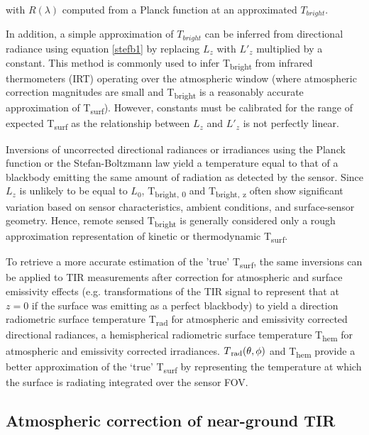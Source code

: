 \noindent with $ R(\lambda) $ computed from a Planck function at an approximated $T_{bright}$. 

In addition, a simple approximation of $T_{bright}$ can be inferred from directional radiance using equation \ref{stefb1} by replacing $ L_z $ with $L'_z$ multiplied by a constant. This method is commonly used to infer T\textsubscript{bright} from infrared thermometers (IRT) operating over the atmospheric window (where atmospheric correction magnitudes are small and T\textsubscript{bright} is a reasonably accurate approximation of T\textsubscript{surf}). However, constants must be calibrated for the range of expected T\textsubscript{surf} as the relationship between $ L_z $ and $L'_z$  is not perfectly linear.

Inversions of uncorrected directional radiances or irradiances using the Planck function or the Stefan-Boltzmann law yield a temperature equal to that of a blackbody emitting the same amount of radiation as detected by the sensor. Since $ L_z $ is unlikely to be equal to $ L_0 $, T\textsubscript{bright, 0} and T\textsubscript{bright, z} often show significant variation based on sensor characteristics, ambient conditions, and surface-sensor geometry. Hence, remote sensed T\textsubscript{bright} is generally considered only a rough approximation representation of kinetic or thermodynamic T\textsubscript{surf}. 

To retrieve a more accurate estimation of the 'true' T\textsubscript{surf}, the same inversions can be applied to TIR measurements after correction for atmospheric and surface emissivity effects (e.g. transformations of the TIR signal to represent that at $ z = 0 $ if the surface was emitting as a perfect blackbody) to yield a direction radiometric surface temperature T\textsubscript{rad} for atmospheric and emissivity corrected directional radiances, a hemispherical radiometric surface temperature T\textsubscript{hem} for atmospheric and emissivity corrected irradiances. $ T\textsubscript{rad} (\theta, \phi) $ and T\textsubscript{hem} provide a better approximation of the ‘true’ T\textsubscript{surf} by representing the temperature at which the surface is radiating integrated over the sensor FOV.


\subsection{Atmospheric correction of near-ground TIR} \label{Atmospheric correction of near-ground TIR}

